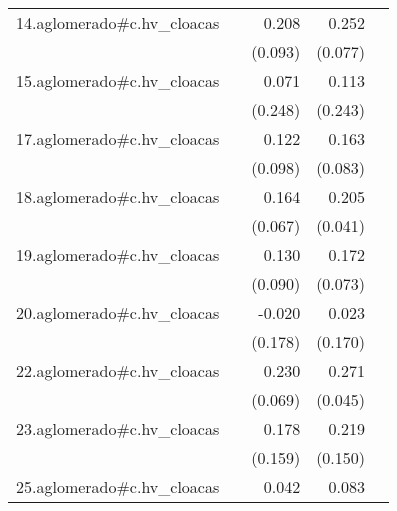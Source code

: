 {\begin{longtable}{l*{4}{D{.}{.}{-1}}}
\addlinespace
14.aglomerado#c.hv\_cloacas&                     &       0.208\sym{*}  &       0.252\sym{***}&                     \\
            &                     &     (0.093)         &     (0.077)         &                     \\
\addlinespace
15.aglomerado#c.hv\_cloacas&                     &       0.071         &       0.113         &                     \\
            &                     &     (0.248)         &     (0.243)         &                     \\
\addlinespace
17.aglomerado#c.hv\_cloacas&                     &       0.122         &       0.163\sym{*}  &                     \\
            &                     &     (0.098)         &     (0.083)         &                     \\
\addlinespace
18.aglomerado#c.hv\_cloacas&                     &       0.164\sym{*}  &       0.205\sym{***}&                     \\
            &                     &     (0.067)         &     (0.041)         &                     \\
\addlinespace
19.aglomerado#c.hv\_cloacas&                     &       0.130         &       0.172\sym{*}  &                     \\
            &                     &     (0.090)         &     (0.073)         &                     \\
\addlinespace
20.aglomerado#c.hv\_cloacas&                     &      -0.020         &       0.023         &                     \\
            &                     &     (0.178)         &     (0.170)         &                     \\
\addlinespace
22.aglomerado#c.hv\_cloacas&                     &       0.230\sym{***}&       0.271\sym{***}&                     \\
            &                     &     (0.069)         &     (0.045)         &                     \\
\addlinespace
23.aglomerado#c.hv\_cloacas&                     &       0.178         &       0.219         &                     \\
            &                     &     (0.159)         &     (0.150)         &                     \\
\addlinespace
25.aglomerado#c.hv\_cloacas&                     &       0.042         &       0.083         &                     \\

\end{longtable}}
